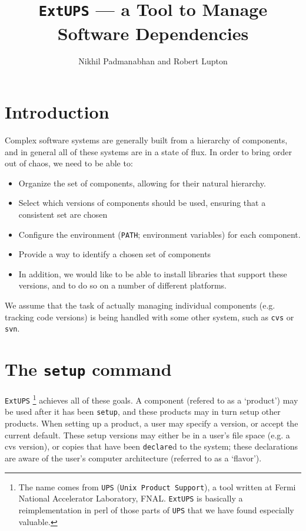 \documentclass{article}
\newcommand{\code}[1]{\texttt{#1}}
\newcommand{\eups}{\code{ExtUPS}}
\begin{document}
\title{\eups{} --- a Tool to Manage Software Dependencies}
\author{Nikhil Padmanabhan and Robert Lupton}

\maketitle


\section{Introduction}

Complex software systems are generally built from a hierarchy of
components, and in general all of these systems are in a state of
flux.  In order to bring order out of chaos, we need to be able to:
\begin{itemize}
  \item Organize the set of components, allowing for their natural
    hierarchy.

  \item
    Select which versions of components should be used, ensuring
    that a consistent set are chosen

  \item
    Configure the environment (\code{PATH}; environment variables)
    for each component.

  \item
    Provide a way to identify a chosen set of components

  \item
    In addition, we would like to be able to install libraries that support
    these versions, and to do so on a number of different platforms.
\end{itemize}

We assume that the task of actually managing individual components
(e.g. tracking code versions) is being handled with some other system,
such as \texttt{cvs} or \texttt{svn}.

\section{The \code{setup} command}

\eups
\footnote{%
  The name comes from \code{UPS} (\code{Unix Product Support}), a
  tool written at Fermi National Accelerator Laboratory, FNAL. \eups{}
  is basically a reimplementation in perl of those parts of \code{UPS}
  that we have found especially valuable.}
achieves all of these goals. A component (refered to as a `product')
may be used after it has been \code{setup}, and these products may
in turn setup other products. When setting up a product, a user
may specify a version, or accept the current default. These setup versions
may either be in a user's file space (e.g. a cvs version), or copies
that have been \code{declare}d to the system; these declarations are
aware of the user's computer architecture (referred to as a `flavor').
\end{document}
